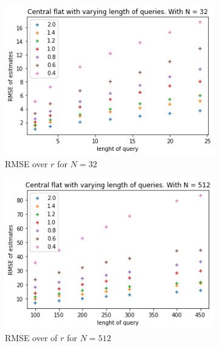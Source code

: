 \documentclass[11pt]{article}
\theoremstyle{definition}
\begin{document}
\begin{figure}[H]
\centering
\begin{subfigure}{.3\textwidth}
  \centering
  \includegraphics[width=\linewidth]{figures/central_flat/varying_r/cen_flat_varying_length_N=32.png}
  \caption{RMSE over $r$ for $N=32$}
  \label{fig:cen_r_sub1}
\end{subfigure}%
\begin{subfigure}{.3\textwidth}
  \centering
  \includegraphics[width=\linewidth]{figures/central_flat/varying_r/cen_flat_varying_length_N=512.png}
  \caption{RMSE over of $r$ for $N=512$}
  \label{fig:cen_r_sub2}
\end{subfigure}
\begin{subfigure}{.3\textwidth}
  \centering

\end{subfigure}
\end{figure}
\end{document}
